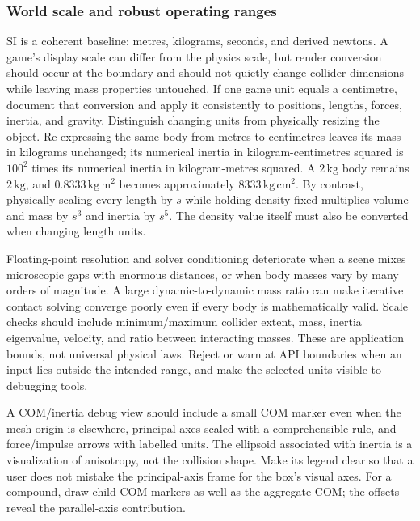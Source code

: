 \subsubsection{World scale and robust operating ranges}\label{06-engine-ii-ch034-world-scale-and-robust-operating-ranges}

SI is a coherent baseline: metres, kilograms, seconds, and derived newtons. A game's display scale can differ from the physics scale, but render conversion should occur at the boundary and should not quietly change collider dimensions while leaving mass properties untouched. If one game unit equals a centimetre, document that conversion and apply it consistently to positions, lengths, forces, inertia, and gravity. Distinguish changing units from physically resizing the object. Re-expressing the same body from metres to centimetres leaves its mass in kilograms unchanged; its numerical inertia in kilogram-centimetres squared is \(100^2\) times its numerical inertia in kilogram-metres squared. A \(2\,\mathrm{kg}\) body remains \(2\,\mathrm{kg}\), and \(0.8333\,\mathrm{kg\,m^2}\) becomes approximately \(8333\,\mathrm{kg\,cm^2}\). By contrast, physically scaling every length by \(s\) while holding density fixed multiplies volume and mass by \(s^3\) and inertia by \(s^5\). The density value itself must also be converted when changing length units.

Floating-point resolution and solver conditioning deteriorate when a scene mixes microscopic gaps with enormous distances, or when body masses vary by many orders of magnitude. A large dynamic-to-dynamic mass ratio can make iterative contact solving converge poorly even if every body is mathematically valid. Scale checks should include minimum/maximum collider extent, mass, inertia eigenvalue, velocity, and ratio between interacting masses. These are application bounds, not universal physical laws. Reject or warn at API boundaries when an input lies outside the intended range, and make the selected units visible to debugging tools.

A COM/inertia debug view should include a small COM marker even when the mesh origin is elsewhere, principal axes scaled with a comprehensible rule, and force/impulse arrows with labelled units. The ellipsoid associated with inertia is a visualization of anisotropy, not the collision shape. Make its legend clear so that a user does not mistake the principal-axis frame for the box's visual axes. For a compound, draw child COM markers as well as the aggregate COM; the offsets reveal the parallel-axis contribution.

